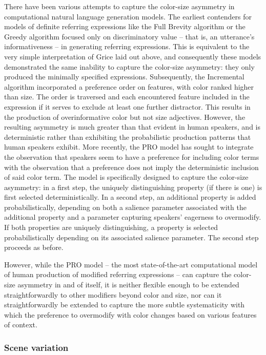 \documentclass[11pt]{article}
\begin{document}
There have been various attempts to capture the color-size asymmetry in computational natural language generation models. The earliest contenders for models of definite referring expressions like the Full Brevity algorithm \cite{Dale1989} or the Greedy algorithm \cite{Dale1989} focused only on discriminatory value -- that is, an utterance's informativeness -- in generating referring expressions. This is equivalent to the very simple interpretation of Grice laid out above, and consequently these models demonstrated the same inability to capture the color-size asymmetry: they only produced the minimally specified expressions. Subsequently, the Incremental algorithm \cite{dale1995} incorporated a preference order on features, with color ranked higher than size. The order is traversed and each encountered feature included in the expression if it serves to exclude at least one further distractor. This results in the production of overinformative color but not size adjectives. However, the resulting asymmetry is much greater than that evident in human speakers, and is deterministic rather than exhibiting the probabilistic production patterns that human speakers exhibit. More recently, the PRO model \cite{GattEtAl2013} has sought to integrate the observation that speakers seem to have a preference for including color terms with the observation that a preference does not imply the deterministic inclusion of said color term. The model is specifically designed to capture the color-size asymmetry: in a first step, the uniquely distinguishing property (if there is one) is first selected deterministically. In a second step, an additional property is added probabilistically, depending on both a salience parameter associated with the additional property and a parameter capturing speakers' eagerness to overmodify. If both properties are uniquely distinguishing, a property is selected probabilistically depending on its associated salience parameter. The second step proceeds as before.

However, while the PRO model -- the most state-of-the-art computational model of human production of modified referring expressions -- can capture the color-size asymmetry in and of itself, it is neither flexible enough to be extended straightforwardly to other modifiers beyond color and size, nor can it straightforwardly be extended to capture the more subtle systematicity with which the preference to overmodify with color changes based on various features of context. 

\subsubsection{Scene variation}
\label{sec:scenevariation}
\end{document}
